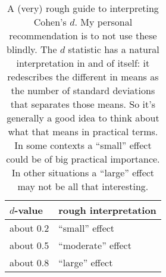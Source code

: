 \begin{table}[t]
\caption{A (very) rough guide to interpreting Cohen's $d$. My personal recommendation is to not use these blindly. The $d$ statistic has a natural interpretation in and of itself: it redescribes the different in means as the number of standard deviations that separates those means. So it's generally a good idea to think about what that means in practical terms. In some contexts a ``small'' effect could be of big practical importance. In other situations a ``large'' effect may not be all that interesting.} 
\label{tab:cohensdinterpretation}
\centering
\vspace*{6pt}
\begin{tabular}{l|l}
$d$-value & rough interpretation \\ \hline
about 0.2 & ``small'' effect  \\
about 0.5 & ``moderate'' effect \\
about 0.8 & ``large'' effect 
\end{tabular}
\vspace*{6pt}
\HR
\end{table}


